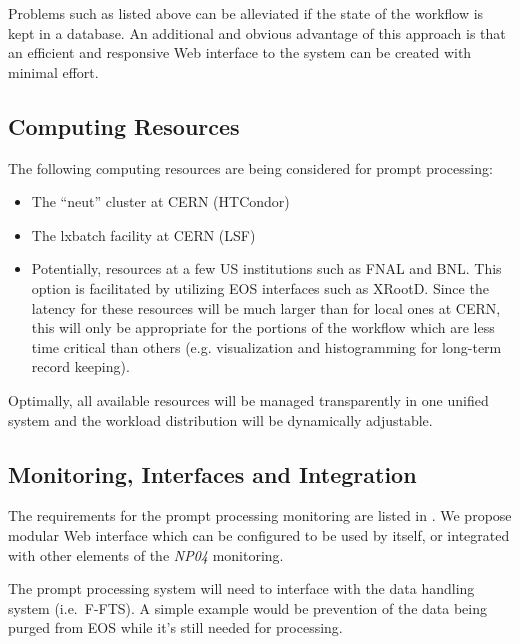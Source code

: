 \documentclass[pdftex,12pt,letter]{article}
\newcommand{\expname}{\textit{NP04}\xspace}
\begin{document}
\noindent Problems such as listed above can be alleviated if the state of the workflow is kept in a database.
An additional and obvious advantage of this approach is that an efficient and responsive Web interface to
the system can be created with minimal effort.

\subsection{Computing Resources}
The following computing resources are being considered for prompt processing:
\begin{itemize}

\item The ``neut'' cluster  \cite{neut} at CERN (HTCondor)

\item The lxbatch facility \cite{lxbatch} at CERN (LSF)

\item Potentially, resources at a few US institutions such as FNAL and BNL.  This option is facilitated
by utilizing EOS interfaces such as XRootD. Since the latency for these resources will be much larger
than for local ones at CERN, this will only be appropriate for the portions of the workflow which
are less time critical than others (e.g. visualization and histogramming for long-term record keeping).

\end{itemize}

\noindent Optimally, all available resources will be managed transparently in one unified system and
the workload distribution will be dynamically adjustable.

\subsection{Monitoring, Interfaces and Integration}
The requirements for the prompt processing monitoring are listed in \cite{docdb1811}.
We propose modular Web interface which can be configured to be used by itself, or integrated
with other elements of the \expname monitoring. 

The prompt processing system will need to interface with the data handling system (i.e.~F-FTS). A simple example
would be prevention of the data being purged from EOS while it's still needed for processing.
\end{document}
